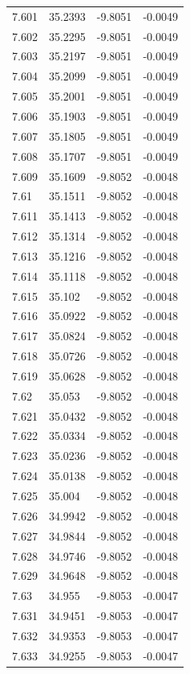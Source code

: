 \begin{tabular}{llll}
7.601 & 35.2393 & -9.8051 & -0.0049 \\
7.602 & 35.2295 & -9.8051 & -0.0049 \\
7.603 & 35.2197 & -9.8051 & -0.0049 \\
7.604 & 35.2099 & -9.8051 & -0.0049 \\
7.605 & 35.2001 & -9.8051 & -0.0049 \\
7.606 & 35.1903 & -9.8051 & -0.0049 \\
7.607 & 35.1805 & -9.8051 & -0.0049 \\
7.608 & 35.1707 & -9.8051 & -0.0049 \\
7.609 & 35.1609 & -9.8052 & -0.0048 \\
7.61 & 35.1511 & -9.8052 & -0.0048 \\
7.611 & 35.1413 & -9.8052 & -0.0048 \\
7.612 & 35.1314 & -9.8052 & -0.0048 \\
7.613 & 35.1216 & -9.8052 & -0.0048 \\
7.614 & 35.1118 & -9.8052 & -0.0048 \\
7.615 & 35.102 & -9.8052 & -0.0048 \\
7.616 & 35.0922 & -9.8052 & -0.0048 \\
7.617 & 35.0824 & -9.8052 & -0.0048 \\
7.618 & 35.0726 & -9.8052 & -0.0048 \\
7.619 & 35.0628 & -9.8052 & -0.0048 \\
7.62 & 35.053 & -9.8052 & -0.0048 \\
7.621 & 35.0432 & -9.8052 & -0.0048 \\
7.622 & 35.0334 & -9.8052 & -0.0048 \\
7.623 & 35.0236 & -9.8052 & -0.0048 \\
7.624 & 35.0138 & -9.8052 & -0.0048 \\
7.625 & 35.004 & -9.8052 & -0.0048 \\
7.626 & 34.9942 & -9.8052 & -0.0048 \\
7.627 & 34.9844 & -9.8052 & -0.0048 \\
7.628 & 34.9746 & -9.8052 & -0.0048 \\
7.629 & 34.9648 & -9.8052 & -0.0048 \\
7.63 & 34.955 & -9.8053 & -0.0047 \\
7.631 & 34.9451 & -9.8053 & -0.0047 \\
7.632 & 34.9353 & -9.8053 & -0.0047 \\
7.633 & 34.9255 & -9.8053 & -0.0047 \\

\end{tabular}
